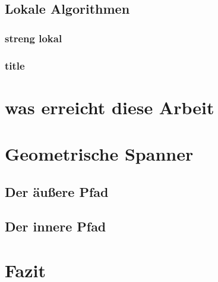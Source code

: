 \documentclass[a4paper,twoside]{IEEEtran}
\begin{document}
\subsection{Lokale Algorithmen}
\subsubsection{streng lokal}
\subsubsection{title}


\section{was erreicht diese Arbeit} %

\section{Geometrische Spanner}
\subsection{Der äußere Pfad}
\subsection{Der innere Pfad}


\section{Fazit}





\end{document}
